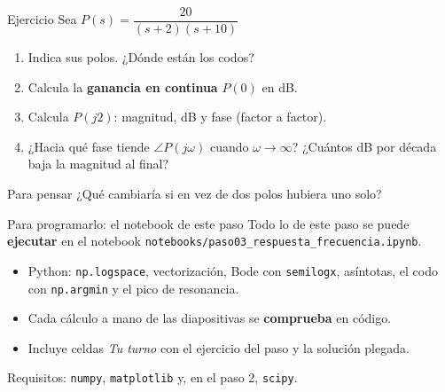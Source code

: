 \documentclass[aspectratio=169,11pt]{beamer}
\begin{document}
\begin{frame}{Ejercicio}
  Sea \quad $P(s)=\dfrac{20}{(s+2)(s+10)}$
  \begin{enumerate}
    \item Indica sus polos. ¿Dónde están los codos?
    \item Calcula la \textbf{ganancia en continua} $P(0)$ en dB.
    \item Calcula $P(j2)$: magnitud, dB y fase (factor a factor).
    \item ¿Hacia qué fase tiende $\angle P(j\omega)$ cuando $\omega\to\infty$? ¿Cuántos dB por década baja la magnitud al final?
  \end{enumerate}
  \vspace{4pt}
  \begin{block}{Para pensar}
    ¿Qué cambiaría si en vez de dos polos hubiera uno solo?
  \end{block}
\end{frame}

\begin{frame}{Para programarlo: el notebook de este paso}
  \small
  Todo lo de este paso se puede \textbf{ejecutar} en el notebook \texttt{notebooks/paso03\_respuesta\_frecuencia.ipynb}.
  \begin{itemize}
    \item Python: \texttt{np.logspace}, vectorización, Bode con \texttt{semilogx}, asíntotas, el codo con \texttt{np.argmin} y el pico de resonancia.
    \item Cada cálculo a mano de las diapositivas se \textbf{comprueba} en código.
    \item Incluye celdas \emph{Tu turno} con el ejercicio del paso y la solución plegada.
  \end{itemize}
  \footnotesize Requisitos: \texttt{numpy}, \texttt{matplotlib} y, en el paso 2, \texttt{scipy}.
\end{frame}
\end{document}
